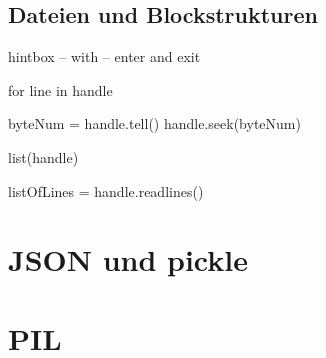\subsection{Dateien und Blockstrukturen}
hintbox -- with -- enter and exit


for line in handle

byteNum = handle.tell()
handle.seek(byteNum)

list(handle)

listOfLines = handle.readlines()

\section{JSON und pickle}


\section{PIL}
